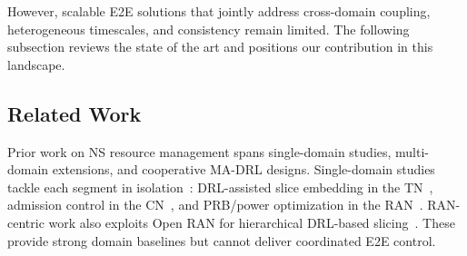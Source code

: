 \documentclass[12pt,lettersize,journal,onecolumn]{IEEEtran}
\begin{document}

However, scalable E2E solutions that jointly address cross-domain coupling, heterogeneous timescales, and consistency remain limited. The following subsection reviews the state of the art and positions our contribution in this landscape.

\subsection{Related Work} \label{related-work-section}
Prior work on NS resource management spans single-domain studies, multi-domain extensions, and cooperative MA-DRL designs. Single-domain studies tackle each segment in isolation~\cite{comst24ebrahimi}: DRL-assisted slice embedding in the TN~\cite{tnsm23johari}, admission control in the CN~\cite{noms20ebrahimi}, and PRB/power optimization in the RAN~\cite{tvt23choi}. RAN-centric work also exploits Open RAN for hierarchical DRL-based slicing~\cite{jiot24filali}. These provide strong domain baselines but cannot deliver coordinated E2E control.
\end{document}
